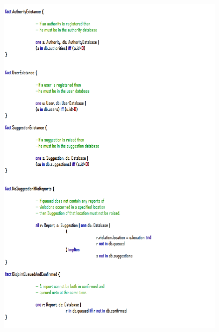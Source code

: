 \documentclass[12pt,a4paper]{article}
\begin{document}
				\begin{figure}[H]
				\centering
				\includegraphics[width=1\linewidth]{../assets/images/exports/user/Facts2.png}
				\label{fig:facts2}
			\end{figure}
\end{document}
